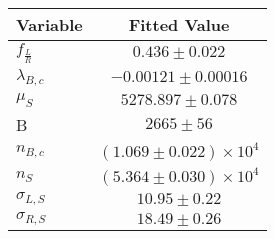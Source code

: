\begin{tabular}[t]{lc}
\hline
Variable &Fitted Value\\
\hline\hline
$f_{\frac{L}{R}}$&$0.436\pm0.022$\\
\hline
$\lambda_{B,c}$&$-0.00121\pm0.00016$\\
\hline
$\mu_S$&$5278.897\pm0.078$\\
\hline
B&$2665\pm56$\\
\hline
$n_{B,c}$&$(1.069\pm0.022)\times 10^4$\\
\hline
$n_S$&$(5.364\pm0.030)\times 10^4$\\
\hline
$\sigma_{L, S}$&$10.95\pm0.22$\\
\hline
$\sigma_{R, S}$&$18.49\pm0.26$\\
\hline
\end{tabular}